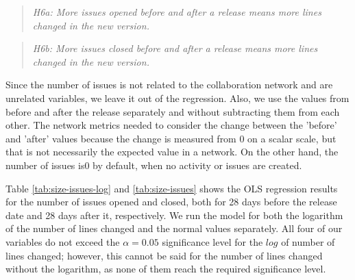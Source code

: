 \begin{quote}
    \textit{H6a: More issues opened before and after a release means more lines changed in the new version.}
\end{quote}

\begin{quote}
    \textit{H6b: More issues closed before and after a release means more lines changed in the new version.}
\end{quote}

Since the number of issues is not related to the collaboration network and are unrelated variables, we leave it out of the regression. Also, we use the values from before and after the release separately and without subtracting them from each other. The network metrics needed to consider the change between the 'before' and 'after' values because the change is measured from 0 on a scalar scale, but that is not necessarily the expected value in a network. On the other hand, the number of issues is0 by default, when no activity or issues are created.

Table \ref{tab:size-issues-log} and \ref{tab:size-issues} shows the OLS regression results for the number of issues opened and closed, both for 28 days before the release date and 28 days after it, respectively. We run the model for both the logarithm of the number of lines changed and the normal values separately. All four of our variables do not exceed the $\alpha = 0.05$ significance level for the $log$ of number of lines changed; however, this cannot be said for the number of lines changed without the logarithm, as none of them reach the required significance level.

